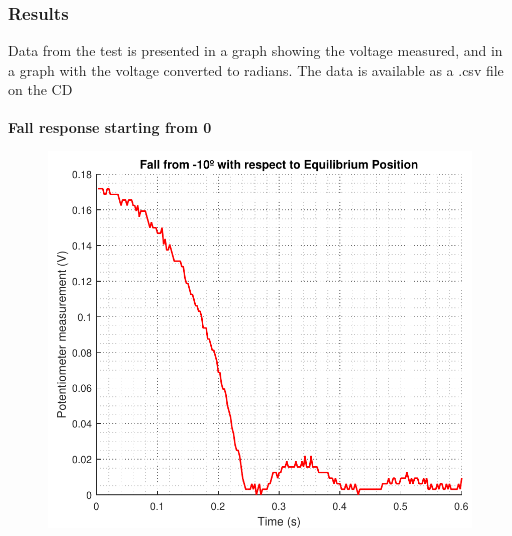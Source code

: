 %
\subsubsection{Results}
Data from the test is presented in a graph showing the voltage measured, and in a graph with the voltage converted to radians.
The data is available as a .csv file on the CD

\small\textbf{Fall response starting from \si{0^\circ}}

\begin{minipage}{\linewidth}
	\begin{minipage}{0.45\linewidth}
		\begin{figure}[H]
			\includegraphics[scale=.53]{figures/aTestFallResponse2}
			\centering
			\vspace{-.4cm}
			\captionsetup{justification=centering}
			\label{graphFallResponsVolt}
		\end{figure}\vspace{-5mm}
	\end{minipage}

\end{minipage}
